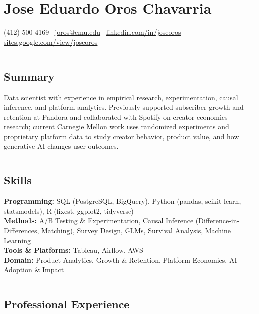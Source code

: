 \documentclass[10pt,letterpaper]{article}
\newcommand{\name}[1]{\section*{#1}}
\newcommand{\sep}{{\color{gray}\,\textbullet\,\,}}
\newcommand{\hsep}{\noindent\textcolor{gray}{\rule{\textwidth}{0.5pt}}}
\newcommand{\block}[1]{\begin{samepage}\hsep\subsection*{#1}\end{samepage}}
\begin{document}
\name{Jose Eduardo Oros Chavarria}

\begin{center}
(412) 500-4169 \sep \href{mailto:joros@cmu.edu}{joros@cmu.edu} \sep \href{https://www.linkedin.com/in/joseoros}{linkedin.com/in/joseoros} \sep \href{https://sites.google.com/view/joseoros}{sites.google.com/view/joseoros}
\end{center}

\block{Summary}

\noindent Data scientist with experience in empirical research, experimentation, causal inference, and platform analytics. Previously supported subscriber growth and retention at Pandora and collaborated with Spotify on creator-economics research; current Carnegie Mellon work uses randomized experiments and proprietary platform data to study creator behavior, product value, and how generative AI changes user outcomes.

\block{Skills}

\noindent\textbf{Programming:} SQL (PostgreSQL, BigQuery), Python (pandas, scikit-learn, statsmodels), R (fixest, ggplot2, tidyverse) \\
\textbf{Methods:} A/B Testing \& Experimentation, Causal Inference (Difference-in-Differences, Matching), Survey Design, GLMs, Survival Analysis, Machine Learning \\
\textbf{Tools \& Platforms:} Tableau, Airflow, AWS \\
\textbf{Domain:} Product Analytics, Growth \& Retention, Platform Economics, AI Adoption \& Impact

\block{Professional Experience}
\end{document}
